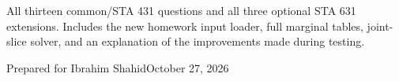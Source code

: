 \documentclass[11pt,letterpaper]{article}
\begin{document}
\begin{titlepage}
\vspace{0.3in}{\Large Every problem, every subpart\par App inputs, results, and written mathematics\par}
\vspace{0.45in}
\begin{insight}
All thirteen common/STA 431 questions and all three optional STA 631 extensions. Includes the new homework input loader, full marginal tables, joint-slice solver, and an explanation of the improvements made during testing.
\end{insight}
\vfill
Prepared for Ibrahim Shahid\hfill October 27, 2026
\end{titlepage}
\tableofcontents\clearpage

\clearpage
\clearpage
\clearpage
\end{document}
